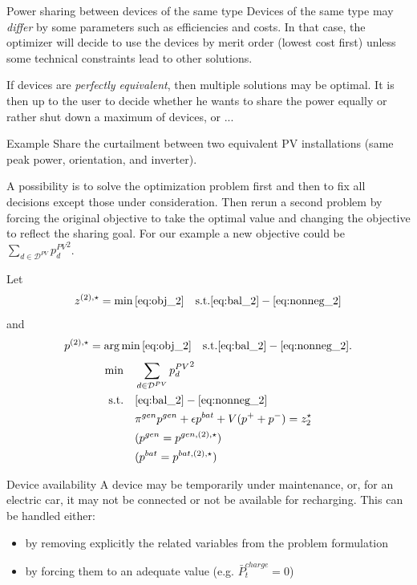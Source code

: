 \begin{frame}[allowframebreaks]{Power sharing between devices of the same type}
    Devices of the same type may \textit{differ} by some parameters such as efficiencies and costs. 
    In that case, the optimizer will decide to use the devices by \alert{merit order} (lowest cost first) unless some technical constraints lead to other solutions.

    If devices are \textit{perfectly equivalent}, then \alert{multiple solutions} may be optimal.
    It is then up to the user to decide whether he wants to share the power equally or rather shut down a maximum of devices, or ...
    
    \begin{block}{Example}
        Share the curtailment between two equivalent PV installations (same peak power, orientation, and inverter).    
    \end{block}
    A possibility is to solve the optimization problem first and then to fix all decisions except those under consideration.
    Then rerun a second problem by forcing the original objective to take the optimal value and changing the objective to reflect the sharing goal.
    For our example a new objective could be $\sum_{d \in\mathcal{D}^{PV}} {p^{PV}_d}^2$.

    Let $$z^{(2), \star} = \min \eqref{eq:obj_2} \quad \text{s.t.} \eqref{eq:bal_2} - \eqref{eq:nonneg_2}$$
    and $$p^{(2), \star} = \arg \min \eqref{eq:obj_2} \quad \text{s.t.} \eqref{eq:bal_2} - \eqref{eq:nonneg_2}.$$
    \begin{subequations}
        \label{eq:RT3}
    \begin{align}
    \min        \quad  & \sum_{d \in\mathcal{D}^{PV}} {p^{PV}_d}^2 \label{eq:obj_3}\\
    \text{s.t.} \quad  & \eqref{eq:bal_2} - \eqref{eq:nonneg_2}  \label{eq:const_3} \\
                       & \pi^{gen} p^{gen}  + \epsilon p^{bat} + V (p^+ + p^-) = z_2^\star \label{eq:eq_obj_3}\\
                       & (p^{gen} = p^{gen, (2), \star})\\
                       & (p^{bat} = p^{bat, (2), \star})
    \end{align}
    \end{subequations}

\end{frame}


\begin{frame}{Device availability}
    A device may be temporarily under maintenance, or, for an electric car, it may not be connected or not be available for recharging.
    This can be handled either:
    \begin{itemize}
        \item by removing explicitly the related variables from the problem formulation
        \item by forcing them to an adequate value (e.g. $\bar{P}^{charge}_t = 0$)        
    \end{itemize}
\end{frame}

